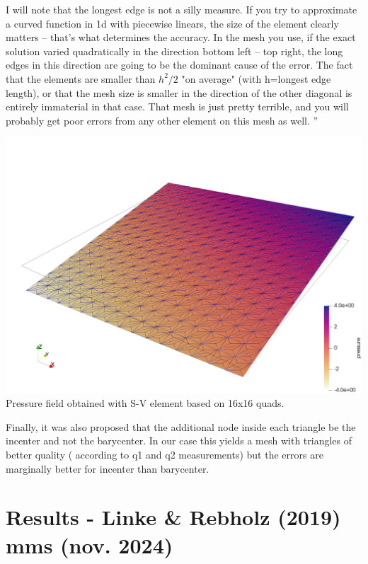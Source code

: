 I will note that the longest edge is not a silly measure. If you try to
approximate a curved function in 1d with piecewise linears, the size of the
element clearly matters -- that's what determines the accuracy. In the mesh
you use, if the exact solution varied quadratically in the direction bottom
left -- top right, the long edges in this direction are going to be the
dominant cause of the error. The fact that the elements are smaller than $h^2/2$
"on average" (with h=longest edge length), or that the mesh size is smaller in
the direction of the other diagonal is entirely immaterial in that case. That
mesh is just pretty terrible, and you will probably get poor errors from any
other element on this mesh as well. 
''




\begin{center}
\includegraphics[width=14cm]{python_codes/fieldstone_120/paperresults/plin/press_SV}\\
{\captionfont Pressure field obtained with S-V element based on 16x16 quads.}
\end{center}

Finally, it was also proposed that the additional node inside each 
triangle be the incenter and not the barycenter. 
In our case this yields a mesh with triangles of better quality (
according to q1 and q2 measurements) but the errors are 
marginally better for incenter than barycenter.


\newpage
\section*{Results - Linke \& Rebholz (2019) mms (nov. 2024)}

